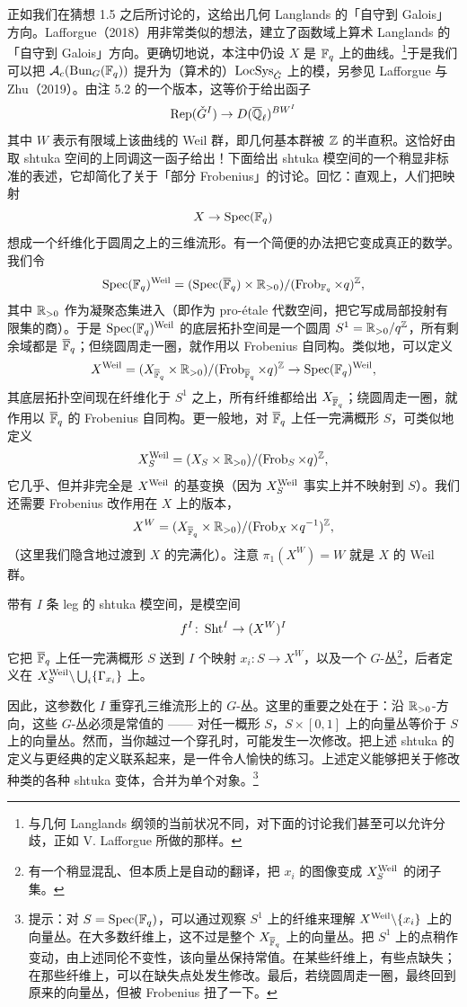 \begin{remark}
正如我们在猜想 1.5 之后所讨论的，这给出几何 Langlands 的「自守到 Galois」方向。Lafforgue（2018）用非常类似的想法，建立了函数域上算术 Langlands 的「自守到 Galois」方向。更确切地说，本注中仍设 $X$ 是 $\mathbb{F}_{q}$ 上的曲线。\footnote{与几何 Langlands 纲领的当前状况不同，对下面的讨论我们甚至可以允许分歧，正如 V. Lafforgue 所做的那样。}于是我们可以把 $\mathcal{A}_c(\operatorname{Bun}_G(\mathbb{F}_{q}))$ 提升为（算术的）$\operatorname{LocSys}_{\check{G}}$ 上的模，另参见 Lafforgue 与 Zhu（2019）。由注 5.2 的一个版本，这等价于给出函子
\[
\operatorname{Rep}(\check{G}^I)\to D(\overline{\mathbb{Q}}_{\ell})^{BW^I}
\]
其中 $W$ 表示有限域上该曲线的 Weil 群，即几何基本群被 $\mathbb{Z}$ 的半直积。这恰好由取 shtuka 空间的上同调这一函子给出！下面给出 shtuka 模空间的一个稍显非标准的表述，它却简化了关于「部分 Frobenius」的讨论。回忆：直观上，人们把映射
\[
X\to\operatorname{Spec}(\mathbb{F}_{q})
\]
想成一个纤维化于圆周之上的三维流形。有一个简便的办法把它变成真正的数学。我们令
\[
\operatorname{Spec}(\mathbb{F}_{q})^{\mathrm{Weil}}=(\operatorname{Spec}(\overline{\mathbb{F}}_q)\times\mathbb{R}_{>0})/(\operatorname{Frob}_{\mathbb{F}_{q}}\times q)^{\mathbb{Z}},
\]
其中 $\mathbb{R}_{>0}$ 作为凝聚态集进入（即作为 pro-étale 代数空间，把它写成局部投射有限集的商）。于是 $\operatorname{Spec}(\mathbb{F}_{q})^{\mathrm{Weil}}$ 的底层拓扑空间是一个圆周 $S^1=\mathbb{R}_{>0}/q^{\mathbb{Z}}$，所有剩余域都是 $\overline{\mathbb{F}}_q$；但绕圆周走一圈，就作用以 Frobenius 自同构。类似地，可以定义
\[
X^{\mathrm{Weil}}=(X_{\overline{\mathbb{F}}_q}\times\mathbb{R}_{>0})/(\operatorname{Frob}_{\overline{\mathbb{F}}_q}\times q)^{\mathbb{Z}}\to\operatorname{Spec}(\mathbb{F}_{q})^{\mathrm{Weil}},
\]
其底层拓扑空间现在纤维化于 $S^1$ 之上，所有纤维都给出 $X_{\overline{\mathbb{F}}_q}$；绕圆周走一圈，就作用以 $\overline{\mathbb{F}}_q$ 的 Frobenius 自同构。更一般地，对 $\overline{\mathbb{F}}_q$ 上任一完满概形 $S$，可类似地定义
\[
X^{\mathrm{Weil}}_S=(X_S\times\mathbb{R}_{>0})/(\operatorname{Frob}_S\times q)^{\mathbb{Z}},
\]
它几乎、但并非完全是 $X^{\mathrm{Weil}}$ 的基变换（因为 $X^{\mathrm{Weil}}_S$ 事实上并不映射到 $S$）。我们还需要 Frobenius 改作用在 $X$ 上的版本，
\[
X^W=(X_{\overline{\mathbb{F}}_q}\times\mathbb{R}_{>0})/(\operatorname{Frob}_X\times q^{-1})^{\mathbb{Z}},
\]
（这里我们隐含地过渡到 $X$ 的完满化）。注意 $\pi_1(X^W)=W$ 就是 $X$ 的 Weil 群。
\end{remark}

\begin{definition}
带有 $I$ 条 leg 的 shtuka 模空间，是模空间
\[
f^I\colon\operatorname{Sht}^I\to(X^W)^I
\]
它把 $\overline{\mathbb{F}}_q$ 上任一完满概形 $S$ 送到 $I$ 个映射 $x_i\colon S\to X^W$，以及一个 $G$-丛\footnote{有一个稍显混乱、但本质上是自动的翻译，把 $x_i$ 的图像变成 $X^{\mathrm{Weil}}_S$ 的闭子集。}，后者定义在 $X^{\mathrm{Weil}}_S{\setminus}\bigcup_i\{\Gamma_{x_i}\}$ 上。
\end{definition}

因此，这参数化 $I$ 重穿孔三维流形上的 $G$-丛。这里的重要之处在于：沿 $\mathbb{R}_{>0}$-方向，这些 $G$-丛必须是常值的 —— 对任一概形 $S$，$S\times[0,1]$ 上的向量丛等价于 $S$ 上的向量丛。然而，当你越过一个穿孔时，可能发生一次修改。把上述 shtuka 的定义与更经典的定义联系起来，是一件令人愉快的练习。上述定义能够把关于修改种类的各种 shtuka 变体，合并为单个对象。\footnote{提示：对 $S=\operatorname{Spec}(\mathbb{F}_{q})$，可以通过观察 $S^1$ 上的纤维来理解 $X^{\mathrm{Weil}}{\setminus}\{x_i\}$ 上的向量丛。在大多数纤维上，这不过是整个 $X_{\overline{\mathbb{F}}_q}$ 上的向量丛。把 $S^1$ 上的点稍作变动，由上述同伦不变性，该向量丛保持常值。在某些纤维上，有些点缺失；在那些纤维上，可以在缺失点处发生修改。最后，若绕圆周走一圈，最终回到原来的向量丛，但被 Frobenius 扭了一下。}

